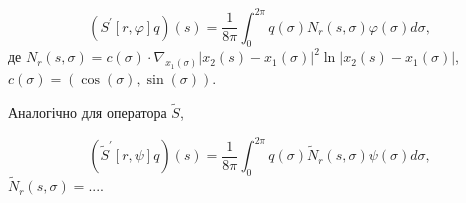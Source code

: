 \documentclass[12pt]{article}
\begin{document}
\begin{equation}
	(S^{'}[r,\varphi]q)(s)=\frac{1}{8\pi}\int_{0}^{2\pi}q(\sigma)N_{r}(s, \sigma)\varphi(\sigma)d\sigma, 
 \end{equation}
 де $N_{r}(s, \sigma)=c(\sigma)\cdot\nabla_{x_{1}(\sigma)}|x_2(s)-x_1(\sigma)|^2\ln |x_2(s)-x_1(\sigma)|$, $c(\sigma)=(\cos (\sigma), \sin (\sigma))$.
 
 Аналогічно для оператора $\tilde{S}$,
 
\begin{equation}
	(\tilde{S}^{'}[r,\psi]q)(s)=\frac{1}{8\pi}\int_{0}^{2\pi}q(\sigma)\tilde{N}_{r}(s, \sigma)\psi(\sigma)d\sigma,
 \end{equation}
 $\tilde{N}_{r}(s, \sigma)=...$.
\end{document}
